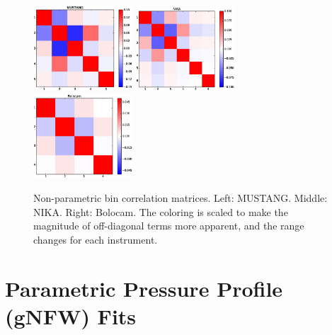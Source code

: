 \documentclass[twocolumn,traditabstract]{aa}
\begin{document}
\begin{figure}[h]
  \centering
  \includegraphics[width=0.33\textwidth]{NIKA_ml_deproj_figs/Real_Joint_gNFW_Real_11011111_2500S_500B_100W_MUSTANG_correlation_matrix_clim_bwr.eps}
  \includegraphics[width=0.33\textwidth]{NIKA_ml_deproj_figs/Real_Joint_gNFW_Real_11011111_2500S_500B_100W_NIKA_correlation_matrix_clim_bwr.eps}
  \includegraphics[width=0.33\textwidth]{NIKA_ml_deproj_figs/Real_Joint_gNFW_Real_11011111_2500S_500B_100W_Bolocam_correlation_matrix_clim_bwr.eps}
  \caption{Non-parametric bin correlation matrices. Left: MUSTANG. Middle: NIKA. Right: Bolocam. The coloring is
    scaled to make the magnitude of off-diagonal terms more apparent, and the range changes for each instrument.}
  \label{fig:corr_matrices}
\end{figure}




\section{Parametric Pressure Profile (gNFW) Fits}
\label{sec:parfits}
\end{document}
